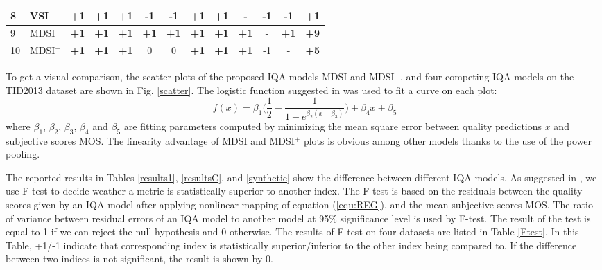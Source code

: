 \begin{table*}[htb]
{\begin{tabular}{|l|l|c|c|c|c|c|c|c|c|c|c||c|}
8         & VSI            & \textbf{+1} & \textbf{+1} & \textbf{+1} & \textbf{-1} & -1          & \textbf{+1} & \textbf{+1} & -           & -1 & -1          & +1          \\ \hline
9         & MDSI           & \textbf{+1} & \textbf{+1} & \textbf{+1} & \textbf{+1} & \textbf{+1} & \textbf{+1} & \textbf{+1} & \textbf{+1} & -  & \textbf{+1} & \textbf{+9} \\ \hline
10        & MDSI$^+$          & \textbf{+1} & \textbf{+1} & \textbf{+1} & 0           & 0           & \textbf{+1} & \textbf{+1} & \textbf{+1} & -1 & -           & \textbf{+5} \\ \hline
\end{tabular} }
\end{table*}



To get a visual comparison, the scatter plots of the proposed IQA models MDSI and MDSI$^+$, and four competing IQA models on the TID2013 dataset are shown in Fig. \ref{scatter}. The logistic function suggested in \cite{statistical2006} was used to fit a curve on each plot:
\begin{equation}
  \ f(x) = \beta_1\Big(\frac{1}{2}-\frac{1}{1-e^{\beta_2(x-\beta_3)}}\Big)+\beta_4x+\beta_5
  \label{equ:REG}
\end{equation}                    
where $\beta_1$, $\beta_2$, $\beta_3$, $\beta_4$ and $\beta_5$ are fitting parameters computed by minimizing the mean square error between quality predictions $x$ and subjective scores MOS. The linearity advantage of MDSI and MDSI$^+$ plots is obvious among other models thanks to the use of the power pooling. 









The reported results in Tables \ref{results1}, \ref{resultsC}, and \ref{synthetic} show the difference between different IQA models. As suggested in \cite{LIVE}, we use F-test to decide weather a metric is statistically superior to another index. The F-test is based on the residuals between the quality scores given by an IQA model after applying nonlinear mapping of equation (\ref{equ:REG}), and the mean subjective scores MOS. The ratio of variance between residual errors of an IQA model to another model at 95\% significance level is used by F-test. The result of the test is equal to 1 if we can reject the null hypothesis and 0 otherwise. The results of F-test on four datasets are listed in Table \ref{Ftest}. In this Table, +1/-1 indicate that corresponding index is statistically superior/inferior to the other index being compared to. If the difference between two indices is not significant, the result is shown by 0. 










